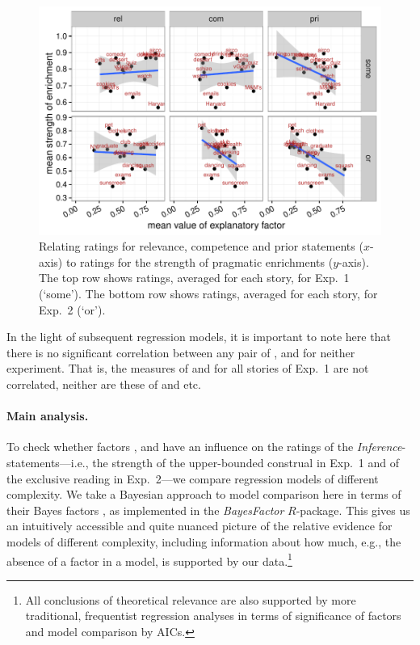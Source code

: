 \documentclass[12pt]{article}
\begin{document}
\begin{figure}
  \centering

  \includegraphics[width = \textwidth]{pics_02/correlationExp12.pdf}
  
  \caption{Relating ratings for relevance, competence and prior statements ($x$-axis) to
    ratings for the strength of pragmatic enrichments ($y$-axis). The top row shows ratings,
    averaged for each story, for Exp.~1 (`some'). The bottom row shows ratings,
    averaged for each story, for Exp.~2 (`or').}
  \label{fig:correlationsExp12}
\end{figure}

In the light of subsequent regression models, it is important to note here that there is no
significant correlation between any pair of \rel, \com and \pri for neither experiment. That is,
the measures of \rel and \com for all stories of Exp.~1 are not correlated, neither are these
of \rel and \pri etc.

\paragraph{Main analysis.} To check whether factors \rel, \com and \pri have an influence on
the ratings of the \emph{Inference}-statements---i.e., the strength of the upper-bounded construal in Exp.~1 and
of the exclusive reading in Exp.~2---we compare regression models of different
complexity. We take a Bayesian approach to model comparison here in terms of their Bayes
factors \citep{RouderMorey2012:Default-Bayes-F}, as implemented in the \emph{BayesFactor}
$R$-package. This gives us an intuitively accessible and quite nuanced picture of the relative
evidence for models of different complexity, including information about how much, e.g., the
absence of a factor in a model, is supported by our data.\footnote{All conclusions of
  theoretical relevance are also supported by more traditional, frequentist regression analyses
  in terms of significance of factors and model comparison by AICs.}
\end{document}
